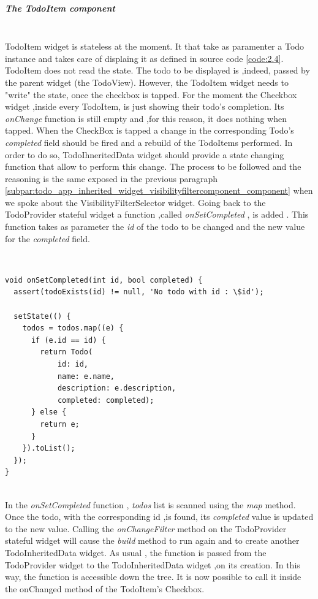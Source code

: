 \subparagraph{The TodoItem component}\mbox{}\\
\label{subpar:todo_app_inherited_widget_todoitem_component}
TodoItem widget is stateless at the moment. It that take as paramenter a Todo instance and takes care of displaing it as defined in source code  \ref{code:2.4}. TodoItem does not read the state. The todo to be displayed is ,indeed, passed by the parent widget (the TodoView). However, the TodoItem widget needs to "write" the state, once the checkbox is tapped. For the moment the Checkbox widget ,inside every TodoItem, is just showing their  todo's completion. Its \textit{onChange   }function is still empty and ,for this reason, it does nothing when tapped. When the CheckBox is tapped a change in the corresponding Todo’s \textit{completed }field should be fired and a rebuild of the TodoItems performed. In order to do so, TodoIhneritedData widget should provide a state changing function that allow to perform this change. The process to be followed and the reasoning is the same exposed in the previous paragraph \ref{subpar:todo_app_inherited_widget_visibilityfiltercomponent_component}  when we spoke about the VisibilityFilterSelector widget. Going back to the TodoProvider stateful widget a function ,called \textit{onSetCompleted  }, is added . This function takes as parameter the \textit{id} of the todo to be changed and the new value for the \textit{completed }field.
\mbox{}\\

\begin{code}

\mbox{}\\
\begin{verbatim}
void onSetCompleted(int id, bool completed) {
  assert(todoExists(id) != null, 'No todo with id : \$id');

  setState(() {
    todos = todos.map((e) {
      if (e.id == id) {
        return Todo(
            id: id,
            name: e.name,
            description: e.description,
            completed: completed);
      } else {
        return e;
      }
    }).toList();
  });
}
\end{verbatim}
\end{code}
\mbox{}\\
In the \textit{onSetCompleted }function , \textit{todos }list is scanned using the \textit{map }method. Once the todo, with the corresponding id ,is found, its \textit{completed }value is updated to the new value. Calling the \textit{onChangeFilter }method on the TodoProvider stateful widget will cause the \textit{build}  method to run again and to create another TodoInheritedData widget. As usual , the function is passed from the TodoProvider widget to the TodoInheritedData widget ,on its creation. In this way, the function is accessible down the tree. It is now possible to call it inside the onChanged method of the TodoItem's Checkbox.


